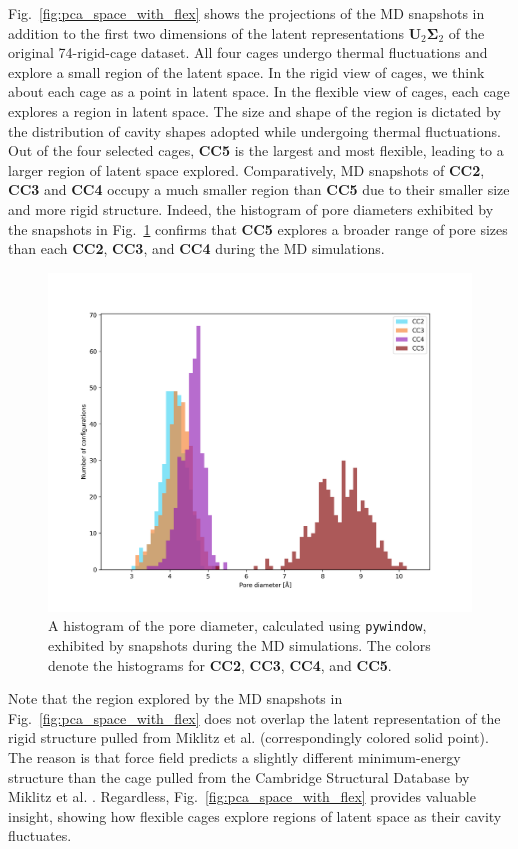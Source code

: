 \documentclass[journal=jacsat,manuscript=article]{achemso}
\begin{document}
Fig.~\ref{fig:pca_space_with_flex} shows the projections of the MD snapshots in addition to the first two dimensions of the latent representations $\mathbf{U}_2\mathbf{\Sigma}_2$ of the original 74-rigid-cage dataset. All four cages undergo thermal fluctuations and explore a small region of the latent space. 
In the rigid view of cages, we think about each cage as a point in latent space. In the flexible view of cages, each cage explores a region in latent space. The size and shape of the region is dictated by the distribution of cavity shapes adopted while undergoing thermal fluctuations. Out of the four selected cages, \textbf{CC5} is the largest and most flexible, leading to a larger region of latent space explored. Comparatively, MD snapshots of \textbf{CC2}, \textbf{CC3} and \textbf{CC4} occupy a much smaller region than \textbf{CC5} due to their smaller size and more rigid structure. Indeed, the histogram of pore diameters exhibited by the snapshots in Fig.~\ref{fig:pore_diameter_histogram} confirms that \textbf{CC5} explores a broader range of pore sizes than each \textbf{CC2}, \textbf{CC3}, and \textbf{CC4} during the MD simulations.


\begin{figure}
\centering
	\includegraphics[width=0.65\columnwidth]{../pore_diameter_histogram.png}
	\caption{A histogram of the pore diameter, calculated using \texttt{pywindow}, exhibited by snapshots during the MD simulations. The colors denote the histograms for \textbf{CC2}, \textbf{CC3}, \textbf{CC4}, and \textbf{CC5}.
	} \label{fig:pore_diameter_histogram}
\end{figure}

Note that the region explored by the MD snapshots in Fig.~\ref{fig:pca_space_with_flex} does not overlap the latent representation of the rigid structure pulled from Miklitz et al. \cite{miklitz2017computational} (correspondingly colored solid point). The reason is that force field predicts a slightly different minimum-energy structure than the cage pulled from the Cambridge Structural Database by Miklitz et al. \cite{miklitz2017computational}. Regardless, Fig.~\ref{fig:pca_space_with_flex} provides valuable insight, showing how flexible cages explore regions of latent space as their cavity fluctuates.
\end{document}
